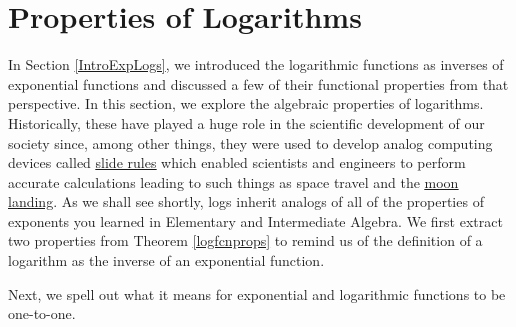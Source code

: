 \section{Properties of Logarithms}

\label{LogProperties}

In Section \ref{IntroExpLogs}, we introduced the logarithmic functions as inverses of exponential functions and discussed a few of their functional properties from that perspective.  In this section, we explore the algebraic properties of logarithms.  Historically, these have played a huge role in the scientific development of our society since, among other things, they were used to develop analog computing devices called \href{http://en.wikipedia.org/wiki/Slide_rule}{\underline{slide rules}} which enabled scientists and engineers to perform accurate calculations leading to such things as space travel and the \href{http://www.redorbit.com/news/space/73297/nasa_marks_35th_anniversary_of_first_moon_landing/}{\underline{moon landing}}.  As we shall see shortly, logs inherit analogs of all of the properties of exponents you learned in Elementary and Intermediate Algebra.  We first extract two properties from Theorem \ref{logfcnprops} to remind us of the definition of a logarithm as the inverse of an exponential function.
\smallskip


\smallskip

Next, we spell out what it means for exponential and logarithmic functions to be one-to-one.

\smallskip


